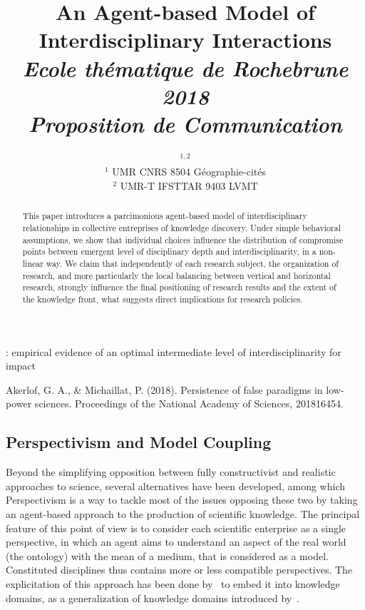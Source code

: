 


\title{An Agent-based Model of Interdisciplinary Interactions\\\medskip
\textit{Ecole thématique de Rochebrune 2018\\
Proposition de Communication
}
}
\author{$^{1,2}$\\
$^{1}$ UMR CNRS 8504 Géographie-cités\\
$^{2}$ UMR-T IFSTTAR 9403 LVMT
}
\date{}


\maketitle

\justify

\begin{abstract}
	This paper introduces a parcimonious agent-based model of interdisciplinary relationships in collective entreprises of knowledge discovery. Under simple behavioral assumptions, we show that individual choices influence the distribution of compromise points between emergent level of disciplinary depth and interdisciplinarity, in a non-linear way. We claim that independently of each research subject, the organization of research, and more particularly the local balancing between vertical and horizontal research, strongly influence the final positioning of research results and the extent of the knowledge front, what suggests direct implications for research policies.
\end{abstract}




\cite{lariviere2010relationship} : empirical evidence of an optimal intermediate level of interdisciplinarity for impact %


Akerlof, G. A., & Michaillat, P. (2018). Persistence of false paradigms in low-power sciences. Proceedings of the National Academy of Sciences, 201816454.


\subsection*{Perspectivism and Model Coupling}

Beyond the simplifying opposition between fully constructivist and realistic approaches to science, several alternatives have been developed, among which Perspectivism \cite{giere2010scientific} is a way to tackle most of the issues opposing these two by taking an agent-based approach to the production of scientific knowledge. The principal feature of this point of view is to consider each scientific enterprise as a single perspective, in which an agent aims to understand an aspect of the real world (the ontology) with the mean of a medium, that is considered as a model. Constituted disciplines thus contains more or less compatible perspectives. The explicitation of this approach has been done by~\cite{raimbault2017knowledge} to embed it into knowledge domains, as a generalization of knowledge domains introduced by~\cite{livet2010}.


